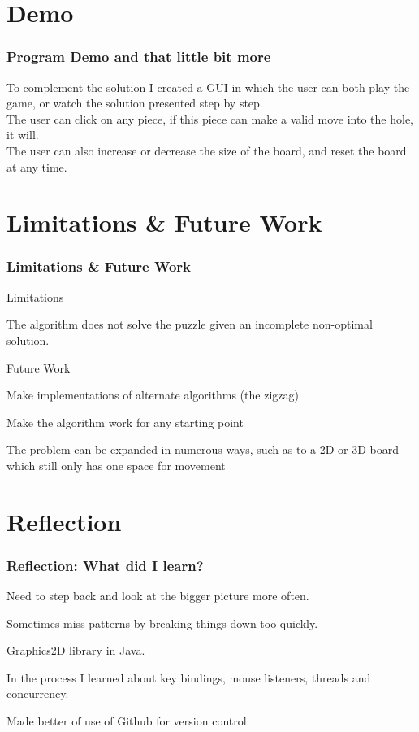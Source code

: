 \documentclass{beamer}
\begin{document}
\section{Demo}
	\begin{frame}
		\frametitle{Program Demo and that little bit more}
		To complement the solution I created a GUI in which the user can both play the game, or 
		watch the solution presented step by step. \\
		\vfill
		The user can click on any piece, if this piece can make a valid move into the hole, it will. \\
		\vfill
		The user can also increase or decrease the size of the board, and reset the board at any time. 
		
	\end{frame}
\section{Limitations \& Future Work}
	\begin{frame}
		\frametitle{Limitations \& Future Work}
		Limitations
		\blt
			\item The algorithm does not solve the puzzle given an incomplete non-optimal solution. 
		\finblt
		
		Future Work
		\blt
			\item Make implementations of alternate algorithms (the zigzag)
			\item Make the algorithm work for any starting point
			\item The problem can be expanded in numerous ways, such as to a 2D or 3D board which still 
			only has one space for movement
			
		\finblt
	\end{frame}
\section{Reflection}
	\begin{frame}
		\frametitle{Reflection: What did I learn?}

		\blt
			\item Need to step back and look at the bigger picture more often. 
			\item Sometimes miss patterns by breaking things down too quickly.
			\vfill
			\item Graphics2D library in Java. 
			\item In the process I learned about key bindings, mouse listeners,  
			threads and concurrency. 
			\item Made better of use of Github for version control.
		\finblt
		

	\end{frame}
	
\end{document}
